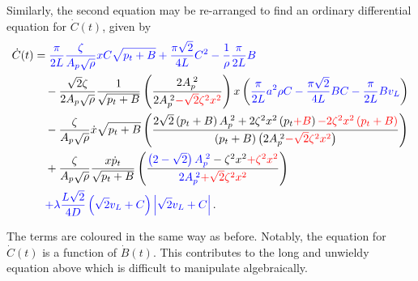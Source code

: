 Similarly, the second equation may be re-arranged to find an ordinary differential equation for $\dot{C}(t)$, given by
~
\begin{equation} \label{eq: QWMFullDiffC}
\begin{split}
    \dot{C}(t) &=
    \textcolor{Blue}{
    \frac{\pi}{2L} \frac{\zeta}{A_p \sqrt{\rho}} x C \sqrt{p_t + B}
    + \frac{\pi \sqrt{2}}{4 L} C^2
    - \frac{1}{\rho} \frac{\pi}{2L} B
    } \\ & \quad %
    - \frac{\sqrt{2} \zeta}{2 A_p \sqrt{\rho}} \frac{1}{\sqrt{p_t+B}} \left( \frac{2 A_p\power{2}}{2 A_p\power{2} \textcolor{Red}{- \sqrt{2} \zeta^2 x^2}} \right) x \left(
    \textcolor{Blue}{
    \frac{\pi}{2L} a^2 \rho C
    - \frac{\pi \sqrt{2}}{4 L} B C
    - \frac{\pi}{2L} B v_L }
    \right)
    \\ & \quad %
    - \frac{\zeta}{A_p \sqrt{\rho}} \dot{x} \sqrt{p_t + B} \left( 
    \frac{ 2 \sqrt{2} \left( p_t + B \right) A_p\power{2} + 2 \zeta^2 x^2 \left( p_t \textcolor{red}{+ B} \right) \textcolor{Red}{- 2 \zeta^2 x^2 \left( p_t + B \right)} }
    { \left( p_t + B \right) \left( 2 A_p\power{2} \textcolor{Red}{- \sqrt{2} \zeta^2 x^2} \right) }
    \right)
    \\ & \quad %
    + \frac{\zeta}{A_p \sqrt{\rho}} \frac{x \dot{p}_t}{\sqrt{p_t+B}} \left( \frac{
    \textcolor{Blue}{\left( 2 - \sqrt{2} \right) A_p\power{2}}
    - \zeta^2 x^2 \textcolor{Red}{+ \zeta^2 x^2}}{
    \textcolor{Blue}{2 A_p\power{2}}
    \textcolor{Red}{+ \sqrt{2} \zeta^2 x^2}} \right)
    \\ & \quad %
    \textcolor{Blue}{
    + \lambda \frac{L \sqrt{2}}{4 D} \left( \sqrt{2} v_L + C \right) \left| \sqrt{2} v_L + C \right| } \, .
\end{split}
\end{equation}

The terms are coloured in the same way as before. Notably, the equation for $\dot{C}(t)$ is a function of $\dot{B}(t)$. This contributes to the long and unwieldy equation above which is difficult to manipulate algebraically.



